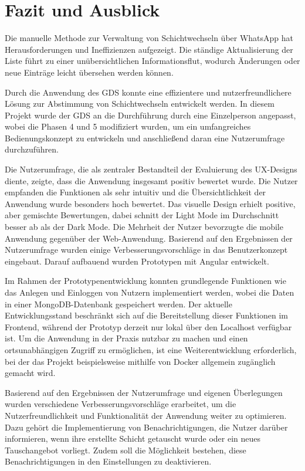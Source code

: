 \chapter{Fazit und Ausblick}

Die manuelle Methode zur Verwaltung von Schichtwechseln über WhatsApp hat Herausforderungen und Ineffizienzen aufgezeigt. Die ständige Aktualisierung der Liste führt zu einer unübersichtlichen Informationsflut, wodurch Änderungen oder neue Einträge leicht übersehen werden können.

Durch die Anwendung des GDS konnte eine effizientere und nutzerfreundlichere Lösung zur Abstimmung von Schichtwechseln entwickelt werden. In diesem Projekt wurde der GDS an die Durchführung durch eine Einzelperson angepasst, wobei die Phasen 4 und 5 modifiziert wurden, um ein umfangreiches Bedienungskonzept zu entwickeln und anschließend daran eine Nutzerumfrage durchzuführen.

Die Nutzerumfrage, die als zentraler Bestandteil der Evaluierung des UX-Designs diente, zeigte, dass die Anwendung insgesamt positiv bewertet wurde. Die Nutzer empfanden die Funktionen als sehr intuitiv und die Übersichtlichkeit der Anwendung wurde besonders hoch bewertet. Das visuelle Design erhielt positive, aber gemischte Bewertungen, dabei schnitt der Light Mode im Durchschnitt besser ab als der Dark Mode. Die Mehrheit der Nutzer bevorzugte die mobile Anwendung gegenüber der Web-Anwendung. Basierend auf den Ergebnissen der Nutzerumfrage wurden einige Verbesserungsvorschläge in das Benutzerkonzept eingebaut. Darauf aufbauend wurden Prototypen mit Angular entwickelt.

Im Rahmen der Prototypenentwicklung konnten grundlegende Funktionen wie das Anlegen und Einloggen von Nutzern implementiert werden, wobei die Daten in einer MongoDB-Datenbank gespeichert werden. Der aktuelle Entwicklungsstand beschränkt sich auf die Bereitstellung dieser Funktionen im Frontend, während der Prototyp derzeit nur lokal über den Localhost verfügbar ist. Um die Anwendung in der Praxis nutzbar zu machen und einen ortsunabhängigen Zugriff zu ermöglichen, ist eine Weiterentwicklung erforderlich, bei der das Projekt beispielsweise mithilfe von Docker allgemein zugänglich gemacht wird.

Basierend auf den Ergebnissen der Nutzerumfrage und eigenen Überlegungen wurden verschiedene Verbesserungsvorschläge erarbeitet, um die Nutzerfreundlichkeit und Funktionalität der Anwendung weiter zu optimieren. Dazu gehört die Implementierung von Benachrichtigungen, die Nutzer darüber informieren, wenn ihre erstellte Schicht getauscht wurde oder ein neues Tauschangebot vorliegt. Zudem soll die Möglichkeit bestehen, diese Benachrichtigungen in den Einstellungen zu deaktivieren. 

